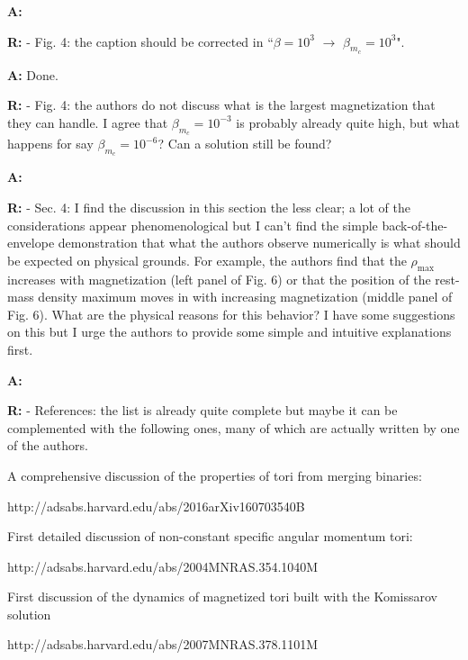 \documentclass{article}
\begin{document}
{\bigskip

{\bf A:} 

\bigskip

{\bf R:} - Fig. 4: the caption should be corrected in ``$\beta = 10^3$ $\rightarrow $ $\beta_{m_c}
= 10^3$".

\bigskip

{\bf A:} Done.

\bigskip

{\bf R:} - Fig. 4: the authors do not discuss what is the largest magnetization
that they can handle. I agree that $\beta_{m_c} = 10^{-3}$ is probably
already quite high, but what happens for say $\beta_{m_c} = 10^{-6}$? Can
a solution still be found?

\bigskip

{\bf A:} 

\bigskip

{\bf R:} - Sec. 4: I find the discussion in this section the less clear; a lot
of the considerations appear phenomenological but I can't find the
simple back-of-the-envelope demonstration that what the authors observe
numerically is what should be expected on physical grounds. For
example, the authors find that the $\rho_{\mathrm{max}}$ increases with magnetization
(left panel of Fig. 6) or that the position of the rest-mass density
maximum moves in with increasing magnetization (middle panel of
Fig. 6). What are the physical reasons for this behavior? I have some
suggestions on this but I urge the authors to provide some simple and
intuitive explanations first.

\bigskip

{\bf A:}

\bigskip

{\bf R:} - References: the list is already quite complete but maybe it can be
complemented with the following ones, many of which are actually
written by one of the authors.

A comprehensive discussion of the properties of tori from merging binaries:

http://adsabs.harvard.edu/abs/2016arXiv160703540B


First detailed discussion of non-constant specific angular momentum tori:

http://adsabs.harvard.edu/abs/2004MNRAS.354.1040M

First discussion of the dynamics of magnetized tori built with the Komissarov solution

http://adsabs.harvard.edu/abs/2007MNRAS.378.1101M

}
\end{document}
